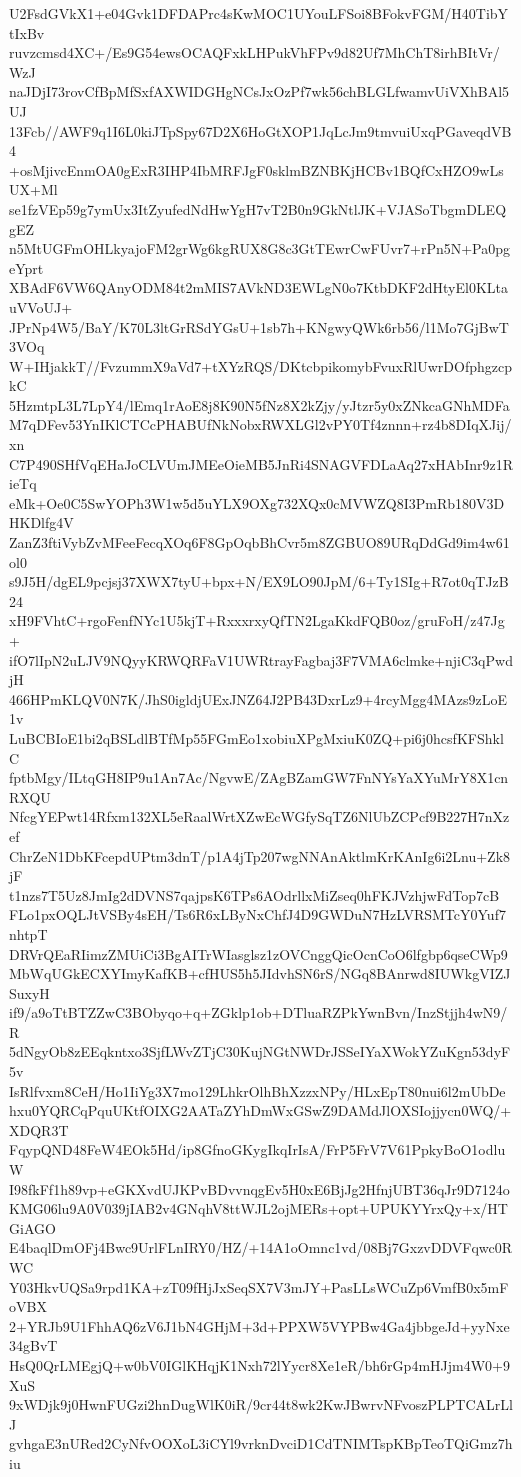 U2FsdGVkX1+e04Gvk1DFDAPrc4sKwMOC1UYouLFSoi8BFokvFGM/H40TibYtIxBv
ruvzcmsd4XC+/Es9G54ewsOCAQFxkLHPukVhFPv9d82Uf7MhChT8irhBItVr/WzJ
naJDjI73rovCfBpMfSxfAXWIDGHgNCsJxOzPf7wk56chBLGLfwamvUiVXhBAl5UJ
13Fcb//AWF9q1I6L0kiJTpSpy67D2X6HoGtXOP1JqLcJm9tmvuiUxqPGaveqdVB4
+osMjivcEnmOA0gExR3IHP4IbMRFJgF0sklmBZNBKjHCBv1BQfCxHZO9wLsUX+Ml
se1fzVEp59g7ymUx3ItZyufedNdHwYgH7vT2B0n9GkNtlJK+VJASoTbgmDLEQgEZ
n5MtUGFmOHLkyajoFM2grWg6kgRUX8G8c3GtTEwrCwFUvr7+rPn5N+Pa0pgeYprt
XBAdF6VW6QAnyODM84t2mMIS7AVkND3EWLgN0o7KtbDKF2dHtyEl0KLtauVVoUJ+
JPrNp4W5/BaY/K70L3ltGrRSdYGsU+1sb7h+KNgwyQWk6rb56/l1Mo7GjBwT3VOq
W+IHjakkT//FvzummX9aVd7+tXYzRQS/DKtcbpikomybFvuxRlUwrDOfphgzcpkC
5HzmtpL3L7LpY4/lEmq1rAoE8j8K90N5fNz8X2kZjy/yJtzr5y0xZNkcaGNhMDFa
M7qDFev53YnIKlCTCcPHABUfNkNobxRWXLGl2vPY0Tf4znnn+rz4b8DIqXJij/xn
C7P490SHfVqEHaJoCLVUmJMEeOieMB5JnRi4SNAGVFDLaAq27xHAbInr9z1RieTq
eMk+Oe0C5SwYOPh3W1w5d5uYLX9OXg732XQx0cMVWZQ8I3PmRb180V3DHKDlfg4V
ZanZ3ftiVybZvMFeeFecqXOq6F8GpOqbBhCvr5m8ZGBUO89URqDdGd9im4w61ol0
s9J5H/dgEL9pcjsj37XWX7tyU+bpx+N/EX9LO90JpM/6+Ty1SIg+R7ot0qTJzB24
xH9FVhtC+rgoFenfNYc1U5kjT+RxxxrxyQfTN2LgaKkdFQB0oz/gruFoH/z47Jg+
ifO7lIpN2uLJV9NQyyKRWQRFaV1UWRtrayFagbaj3F7VMA6clmke+njiC3qPwdjH
466HPmKLQV0N7K/JhS0igldjUExJNZ64J2PB43DxrLz9+4rcyMgg4MAzs9zLoE1v
LuBCBIoE1bi2qBSLdlBTfMp55FGmEo1xobiuXPgMxiuK0ZQ+pi6j0hcsfKFShklC
fptbMgy/ILtqGH8IP9u1An7Ac/NgvwE/ZAgBZamGW7FnNYsYaXYuMrY8X1cnRXQU
NfcgYEPwt14Rfxm132XL5eRaalWrtXZwEcWGfySqTZ6NlUbZCPcf9B227H7nXzef
ChrZeN1DbKFcepdUPtm3dnT/p1A4jTp207wgNNAnAktlmKrKAnIg6i2Lnu+Zk8jF
t1nzs7T5Uz8JmIg2dDVNS7qajpsK6TPs6AOdrllxMiZseq0hFKJVzhjwFdTop7cB
FLo1pxOQLJtVSBy4sEH/Ts6R6xLByNxChfJ4D9GWDuN7HzLVRSMTcY0Yuf7nhtpT
DRVrQEaRIimzZMUiCi3BgAITrWIasglsz1zOVCnggQicOcnCoO6lfgbp6qseCWp9
MbWqUGkECXYImyKafKB+cfHUS5h5JIdvhSN6rS/NGq8BAnrwd8IUWkgVIZJSuxyH
if9/a9oTtBTZZwC3BObyqo+q+ZGklp1ob+DTluaRZPkYwnBvn/InzStjjh4wN9/R
5dNgyOb8zEEqkntxo3SjfLWvZTjC30KujNGtNWDrJSSeIYaXWokYZuKgn53dyF5v
IsRlfvxm8CeH/Ho1IiYg3X7mo129LhkrOlhBhXzzxNPy/HLxEpT80nui6l2mUbDe
hxu0YQRCqPquUKtfOIXG2AATaZYhDmWxGSwZ9DAMdJlOXSIojjycn0WQ/+XDQR3T
FqypQND48FeW4EOk5Hd/ip8GfnoGKygIkqIrIsA/FrP5FrV7V61PpkyBoO1odluW
I98fkFf1h89vp+eGKXvdUJKPvBDvvnqgEv5H0xE6BjJg2HfnjUBT36qJr9D7124o
KMG06lu9A0V039jIAB2v4GNqhV8ttWJL2ojMERs+opt+UPUKYYrxQy+x/HTGiAGO
E4baqlDmOFj4Bwc9UrlFLnIRY0/HZ/+14A1oOmnc1vd/08Bj7GxzvDDVFqwc0RWC
Y03HkvUQSa9rpd1KA+zT09fHjJxSeqSX7V3mJY+PasLLsWCuZp6VmfB0x5mFoVBX
2+YRJb9U1FhhAQ6zV6J1bN4GHjM+3d+PPXW5VYPBw4Ga4jbbgeJd+yyNxe34gBvT
HsQ0QrLMEgjQ+w0bV0IGlKHqjK1Nxh72lYycr8Xe1eR/bh6rGp4mHJjm4W0+9XuS
9xWDjk9j0HwnFUGzi2hnDugWlK0iR/9cr44t8wk2KwJBwrvNFvoszPLPTCALrLlJ
gvhgaE3nURed2CyNfvOOXoL3iCYl9vrknDvciD1CdTNIMTspKBpTeoTQiGmz7hiu
